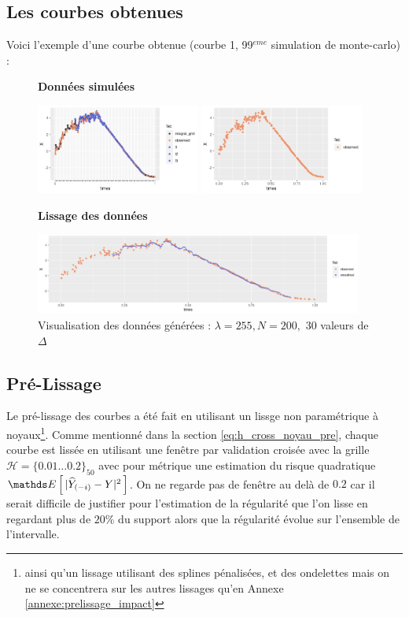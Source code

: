 \subsection{Les courbes obtenues}

Voici l'exemple d'une courbe obtenue (courbe 1, 99$^{eme}$ simulation de monte-carlo) :

\begin{figure}[H]
	\centering
	\textbf{Données simulées}

	\includegraphics[width=0.48\textwidth]{Images/simul/all.jpeg}
	\includegraphics[width=0.48\textwidth]{Images/simul/observed.jpeg}

	\textbf{Lissage des données}

	\includegraphics[width=0.96\textwidth]{Images/simul/smoothed.jpeg}
	\caption{Visualisation des données générées : $\lambda = 255, N = 200,$ 30 valeurs de $\Delta$}
\end{figure}


\subsection{Pré-Lissage}

Le pré-lissage des courbes a été fait en utilisant un lissge non paramétrique à noyaux\footnote{ainsi qu'un lissage utilisant des splines pénalisées, et des ondelettes mais on ne se concentrera sur les autres lissages qu'en Annexe \ref{annexe:prelissage_impact}}. Comme mentionné dans la section \ref{eq:h_cross_noyau_pre}, chaque courbe est lissée en utilisant une fenêtre par validation croisée avec la grille $\mathcal H= \{ 0.01 \dots 0.2 \}_{50}$ avec pour métrique une estimation du risque quadratique $\esperance{|\widehat Y_{(-i)} - Y|^2}$. On ne regarde pas de fenêtre au delà de $0.2$ car il serait difficile de justifier pour l'estimation de la régularité que l'on lisse en regardant plus de $20$\% du support alors que la régularité évolue sur l'ensemble de l'intervalle.

